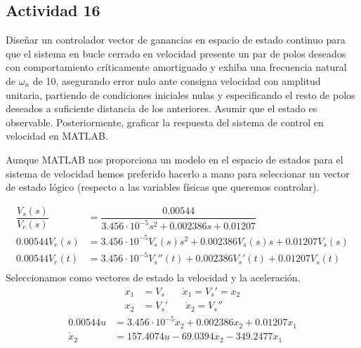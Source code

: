 \newpage
\subsection{Actividad 16}
Diseñar un controlador vector de ganancias en espacio de estado
continuo para que el sistema en bucle cerrado en velocidad presente un
par de polos deseados con comportamiento críticamente amortiguado y
exhiba una frecuencia natural de $\omega_n$ de 10, asegurando error nulo ante
consigna velocidad con amplitud unitaria, partiendo de condiciones
iniciales nulas y especificando el resto de polos deseados a
suficiente distancia de los anteriores. Asumir que el estado es
observable. Posteriormente, graficar la respuesta del sistema de
control en velocidad en \textsc{MATLAB}.

Aunque \textsc{MATLAB} nos proporciona un modelo en el espacio de
estados para el sistema de velocidad hemos preferido hacerlo a mano
para seleccionar un vector de estado lógico (respecto a las variables
físicas que queremos controlar).

\begin{equation}
  \begin{split}
    \dfrac{V_s(s)}{V_e(s)} &= \dfrac{0.00544}{3.456\cdot10^{-5}s^2+0.002386s+0.01207}\\
    0.00544V_e(s) &= 3.456\cdot10^{-5}V_s(s)s^2+0.002386V_s(s)s+0.01207V_s(s)\\
    0.00544V_e(t) &=
    3.456\cdot10^{-5}V_s''(t)+0.002386V_s'(t)+0.01207V_s(t)\\
  \end{split}
\end{equation}
Seleccionamos como vectores de estado la velocidad y la
aceleración.
\begin{equation}
  \begin{split}
    x_1 &= V_s \ \ \ \ \ \ \ \ \dot x_1 = V_s' = x_2\\
    x_2 &= V_s' \ \ \ \ \ \ \ \ \dot x_2 = V_s''
    \end{split}
  \end{equation}
\begin{equation}
  \begin{split}
0.00544 u &=  3.456 \cdot 10^{-5} \dot x_2 + 0.002386 x_2 + 0.01207 x_1\\
\dot x_2 &= 157.4074 u - 69.0394x_2-349.2477x_1\\
\end{split}
\end{equation}

